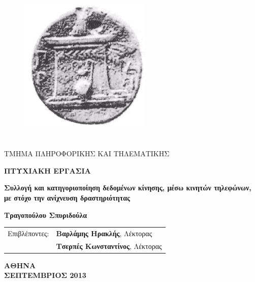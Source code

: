 \documentclass[12pt,twoside,openright]{report}
\begin{document}

\newcommand{\gt}{\greektext}
\newcommand{\lt}{\latintext}
\pagestyle{empty}
\begin{centering}
\begin{figure}
\vspace{-0.8in}
\centering
\includegraphics[scale=0.3]{images/logo}
\end{figure}
\vspace{-0.2in} 
\textbf{\gt \fontsize{14pt}{16.8pt} \bf {}\\}
\vspace{0.2in}
{\fontsize{12pt}{14.4pt}  
ΤΜΗΜΑ ΠΛΗΡΟΦΟΡΙΚΗΣ ΚΑΙ ΤΗΛΕΜΑΤΙΚΗΣ}
\vspace{1.3in}

{ \fontsize{12pt}{14.4pt}  \bf ΠΤΥΧΙΑΚΗ ΕΡΓΑΣΙΑ}
%
\vspace{0.7in}


{  \fontsize{16pt}{19.2pt} \bf Συλλογή και κατηγοριοποίηση δεδομένων κίνησης, μέσω κινητών τηλεφώνων, με στόχο την ανίχνευση δραστηριότητας\gt\\ }

\vspace{0.4in}

{ \fontsize{12pt}{14.4pt}  \bf Τραγοπούλου Σπυριδούλα }

\vspace{0.6in}

{\fontsize{12pt}{14.4pt}  
\begin{tabular}{cl}
Επιβλέποντες: & {\bf Βαρλάμης Ηρακλής},  Λέκτορας\\
& {\bf Τσερπές Κωνσταντίνος}, Λέκτορας\\
\end{tabular}}


\vspace{1.5in}


{\fontsize{12pt}{14.4pt}  \bf ΑΘΗΝΑ \\\vspace{0.2in} ΣΕΠΤΕΜΒΡΙΟΣ 2013\\}
\end{centering}
\end{document}
